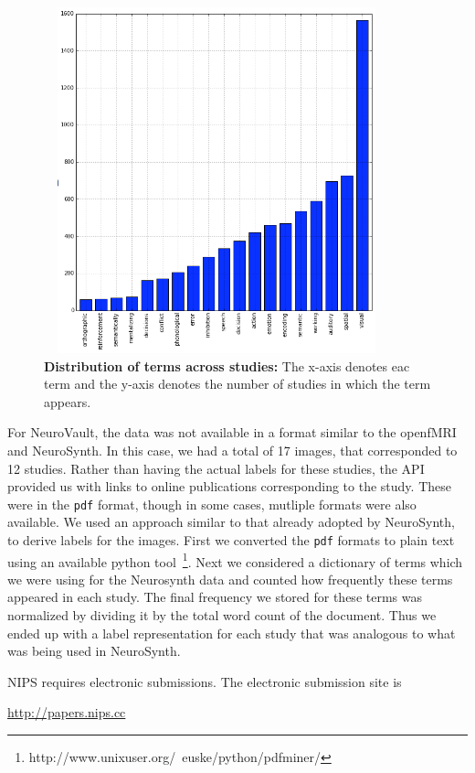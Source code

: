 \documentclass{article} %
\begin{document}
\begin{figure}[h]
\begin{center}
\includegraphics[height=10cm, width=10cm]{histo_new.png}
\end{center}
\caption{\textbf{Distribution of terms across studies:} The x-axis denotes eac term and the y-axis denotes the number of studies in which the term appears.}
\label{fig:histo_new}
\end{figure}

For NeuroVault, the data was not available in a format similar to the openfMRI and NeuroSynth. In this case, we had a total of 17 images, that corresponded to 12 studies. Rather than having the actual labels for these studies, the API provided us with links to online publications corresponding to the study. These were in the \texttt{pdf} format, though in some cases, mutliple formats were also available. We used an approach similar to that already adopted by NeuroSynth, to derive labels for the images. First we converted the \texttt{pdf} formats to plain text using an available python tool~\footnote{http://www.unixuser.org/~euske/python/pdfminer/}. Next we considered a dictionary of terms which we were using for the Neurosynth data and counted how frequently these terms appeared in each study. The final frequency we stored for these terms was normalized by dividing it by the total word count of the document. Thus we ended up with a label representation for each study that was analogous to what was being used in NeuroSynth.


NIPS requires electronic submissions.  The electronic submission site is  
\begin{center}
   \url{http://papers.nips.cc}
\end{center}
\end{document}
